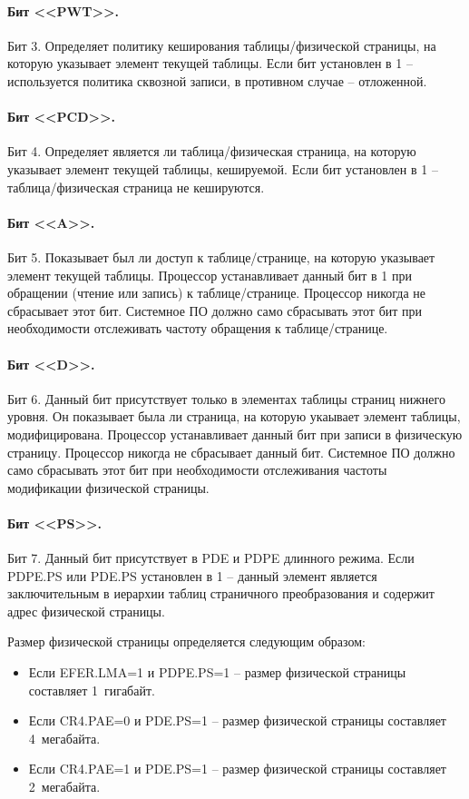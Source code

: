 \paragraph{Бит <<PWT>>.} Бит 3. Определяет политику кеширования таблицы/физической страницы, на которую указывает
элемент текущей таблицы. Если бит установлен в 1 -- используется политика сквозной записи, в противном случае -- отложенной.

\paragraph{Бит <<PCD>>.} Бит 4. Определяет является ли таблица/физическая страница, на которую указывает элемент
текущей таблицы, кешируемой. Если бит установлен в 1 -- таблица/физическая страница не кешируются.

\paragraph{Бит <<A>>.} Бит 5. Показывает был ли доступ к таблице/странице, на которую указывает элемент текущей таблицы.
Процессор устанавливает данный бит в 1 при обращении (чтение или запись) к таблице/странице. Процессор никогда не
сбрасывает этот бит. Системное ПО должно само сбрасывать этот бит при необходимости отслеживать частоту обращения к
таблице/странице.

\paragraph{Бит <<D>>.} Бит 6. Данный бит присутствует только в элементах таблицы страниц нижнего уровня. Он показывает была ли
страница, на которую укаывает элемент таблицы, модифицирована. Процессор устанавливает данный бит при записи в
физическую страницу. Процессор никогда не сбрасывает данный бит. Системное ПО должно само сбрасывать этот бит
при необходимости отслеживания частоты модификации физической страницы.

\paragraph{Бит <<PS>>.} Бит 7. Данный бит присутствует в PDE и PDPE длинного режима.
Если PDPE.PS или PDE.PS установлен в 1 -- данный элемент является заключительным в
иерархии таблиц страничного преобразования и содержит адрес физической страницы.

Размер физической страницы определяется следующим образом:
\begin{itemize}
\item Если EFER.LMA=1 и PDPE.PS=1 -- размер физической страницы составляет 1~гигабайт.
\item Если CR4.PAE=0 и PDE.PS=1 -- размер физической страницы составляет 4~мегабайта.
\item Если CR4.PAE=1 и PDE.PS=1 -- размер физической страницы составляет 2~мегабайта.
\end{itemize}

